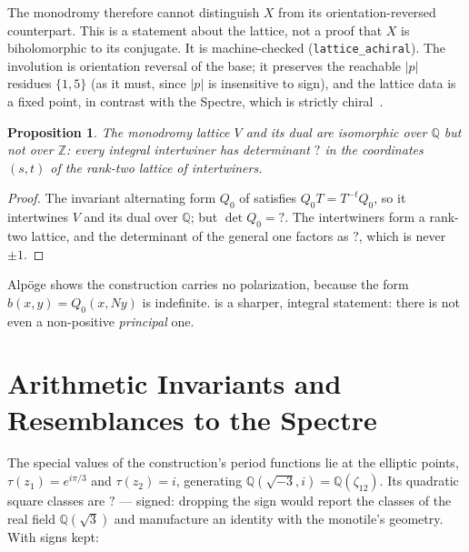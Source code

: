 \documentclass[11pt,a4paper]{article}
\newcommand{\SSDetQZero}{?}\newcommand{\SSDualDetForm}{?}
\newcommand{\SSClassesPeriods}{?}\newcommand{\SSClassesSpectre}{?}
\newcommand{\ZZ}{\mathbb{Z}}
\newcommand{\QQ}{\mathbb{Q}}
\theoremstyle{plain}
\newtheorem{proposition}{Proposition}
\theoremstyle{definition}
\begin{document}
The monodromy therefore cannot distinguish $X$ from its orientation-reversed
counterpart. This is a statement about the lattice, not a proof that $X$ is
biholomorphic to its conjugate. It is machine-checked (\texttt{lattice\_achiral}). The involution is orientation reversal of the base; it preserves the reachable $|p|$ residues $\{1,5\}$ (as it must, since $|p|$ is insensitive to sign), and the lattice data is a fixed point, in contrast with the Spectre, which is strictly chiral~\cite{SmithSpectre}.

\begin{proposition}
\label{prop:dual}
The monodromy lattice $V$ and its dual are isomorphic over $\QQ$ but not
over $\ZZ$: every integral intertwiner has determinant $\SSDualDetForm$ in
the coordinates $(s, t)$ of the rank-two lattice of intertwiners.
\end{proposition}

\begin{proof}
The invariant alternating form $Q_0$ of \cite[Lemma~2.8]{Alpoge} satisfies
$Q_0 T = T^{-t} Q_0$, so it intertwines $V$ and its dual over $\QQ$; but
$\det Q_0 = \SSDetQZero$. The intertwiners form a rank-two lattice, and the
determinant of the general one factors as $\SSDualDetForm$, which is never
$\pm 1$.
\end{proof}

\begin{sloppypar}
Alpöge shows the construction carries no polarization, because the form
$b(x, y) = Q_0(x, Ny)$ is indefinite.  is a sharper,
integral statement: there is not even a non-positive \emph{principal} one.
\end{sloppypar}


\section{Arithmetic Invariants and Resemblances to the Spectre}
\label{sec:arith}

The special values of the construction's period functions lie at the
elliptic points, $\tau(z_1) = e^{i\pi/3}$ and $\tau(z_2) = i$, generating
$\QQ(\sqrt{-3}, i) = \QQ(\zeta_{12})$. Its quadratic square classes are
$\SSClassesPeriods$ --- signed: dropping the sign would report the classes of the real field $\QQ(\sqrt3)$
and manufacture an identity with the monotile's geometry. With signs kept:
\end{document}

